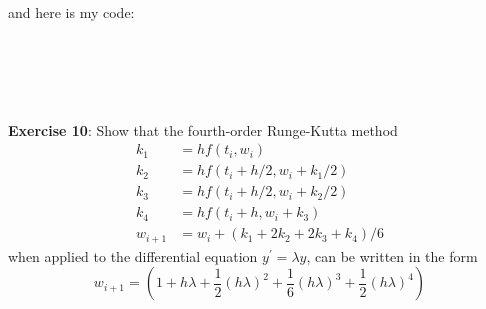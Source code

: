 \documentclass{article}
\begin{document}
\begin{answer}
\begin{center}
        \end{center}
        and here is my code:
        \inputminted{matlab}{./code/TrapezoidNewton.m}
        \inputminted{matlab}{./code/q5f.m}
        \inputminted{matlab}{./code/q5fdy.m}
        \inputminted{matlab}{./code/q5actf.m}
        \inputminted{matlab}{./code/evalActStiff.m}
        \inputminted{matlab}{./code/script8.m}
    \end{answer}

\textbf{Exercise 10}: Show that the fourth-order Runge-Kutta method
    \begin{align*}
        k_{1}     &= hf(t_{i}, w_{i})                              \\
        k_{2}     &= hf(t_{i} + h / 2, w_{i} + k_{1} / 2)          \\
        k_{3}     &= hf(t_{i} + h / 2, w_{i} + k_{2} / 2)          \\
        k_{4}     &= hf(t_{i} + h, w_{i} + k_{3})                  \\
        w_{i + 1} &= w_{i} + (k_{1} + 2k_{2} + 2k_{3} + k_{4}) / 6   
    \end{align*}
when applied to the differential equation $y^{\prime} = \lambda y$, can be written in the form
    \begin{equation*}
        w_{i + 1} = \left(1 + h\lambda + \dfrac{1}{2}(h\lambda)^{2} + \dfrac{1}{6}(h\lambda)^{3} + \dfrac{1}{2}(h\lambda)^{4}\right)
    \end{equation*}
\end{document}
